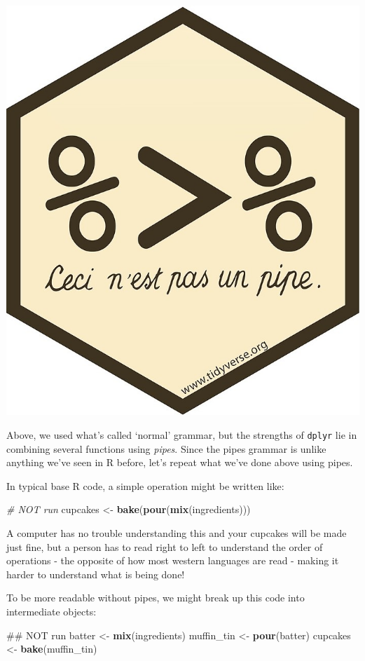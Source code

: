 \documentclass[]{book}
\newenvironment{Shaded}{\begin{snugshade}}{\end{snugshade}}
\newcommand{\KeywordTok}[1]{\textcolor[rgb]{0.13,0.29,0.53}{\textbf{#1}}}
\newcommand{\StringTok}[1]{\textcolor[rgb]{0.31,0.60,0.02}{#1}}
\newcommand{\CommentTok}[1]{\textcolor[rgb]{0.56,0.35,0.01}{\textit{#1}}}
\newcommand{\NormalTok}[1]{#1}
\begin{document}
\begin{center}\includegraphics[width=0.7\linewidth]{img/pipe} \end{center}

Above, we used what's called `normal' grammar, but the strengths of
\texttt{dplyr} lie in combining several functions using \emph{pipes}.
Since the pipes grammar is unlike anything we've seen in R before, let's
repeat what we've done above using pipes.

In typical base R code, a simple operation might be written like:

\begin{Shaded}
\begin{Highlighting}[]
\CommentTok{# NOT run}
\NormalTok{cupcakes <-}\StringTok{ }\KeywordTok{bake}\NormalTok{(}\KeywordTok{pour}\NormalTok{(}\KeywordTok{mix}\NormalTok{(ingredients)))}
\end{Highlighting}
\end{Shaded}

A computer has no trouble understanding this and your cupcakes will be
made just fine, but a person has to read right to left to understand the
order of operations - the opposite of how most western languages are
read - making it harder to understand what is being done!

To be more readable without pipes, we might break up this code into
intermediate objects:

\begin{Shaded}
\begin{Highlighting}[]
\NormalTok{## NOT run}
\NormalTok{batter <-}\StringTok{ }\KeywordTok{mix}\NormalTok{(ingredients)}
\NormalTok{muffin_tin <-}\StringTok{ }\KeywordTok{pour}\NormalTok{(batter)}
\NormalTok{cupcakes <-}\StringTok{ }\KeywordTok{bake}\NormalTok{(muffin_tin)}
\end{Highlighting}
\end{Shaded}
\end{document}
